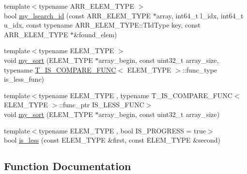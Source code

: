 \begin{DoxyCompactItemize}
\item 
{\footnotesize template$<$typename A\+R\+R\+\_\+\+E\+L\+E\+M\+\_\+\+T\+Y\+P\+E $>$ }\\bool \hyperlink{namespaceuva_1_1utils_1_1containers_1_1utils_ae11ec719b7b1058f8072e77a5a68e0be}{my\+\_\+lsearch\+\_\+id} (const A\+R\+R\+\_\+\+E\+L\+E\+M\+\_\+\+T\+Y\+P\+E $\ast$array, int64\+\_\+t l\+\_\+idx, int64\+\_\+t u\+\_\+idx, const typename A\+R\+R\+\_\+\+E\+L\+E\+M\+\_\+\+T\+Y\+P\+E\+::\+T\+Id\+Type key, const A\+R\+R\+\_\+\+E\+L\+E\+M\+\_\+\+T\+Y\+P\+E $\ast$\&found\+\_\+elem)
\item 
{\footnotesize template$<$typename E\+L\+E\+M\+\_\+\+T\+Y\+P\+E $>$ }\\void \hyperlink{namespaceuva_1_1utils_1_1containers_1_1utils_acd01e6dc6a25f1501ddd95b0e22b2239}{my\+\_\+sort} (E\+L\+E\+M\+\_\+\+T\+Y\+P\+E $\ast$array\+\_\+begin, const uint32\+\_\+t array\+\_\+size, typename \hyperlink{structuva_1_1utils_1_1containers_1_1utils_1_1_t___i_s___c_o_m_p_a_r_e___f_u_n_c}{T\+\_\+\+I\+S\+\_\+\+C\+O\+M\+P\+A\+R\+E\+\_\+\+F\+U\+N\+C}$<$ E\+L\+E\+M\+\_\+\+T\+Y\+P\+E $>$\+::func\+\_\+type is\+\_\+less\+\_\+func)
\item 
{\footnotesize template$<$typename E\+L\+E\+M\+\_\+\+T\+Y\+P\+E , typename T\+\_\+\+I\+S\+\_\+\+C\+O\+M\+P\+A\+R\+E\+\_\+\+F\+U\+N\+C$<$ E\+L\+E\+M\+\_\+\+T\+Y\+P\+E $>$\+::func\+\_\+ptr I\+S\+\_\+\+L\+E\+S\+S\+\_\+\+F\+U\+N\+C$>$ }\\void \hyperlink{namespaceuva_1_1utils_1_1containers_1_1utils_ae19599c8e6a1b8495f99fe40c69db651}{my\+\_\+sort} (E\+L\+E\+M\+\_\+\+T\+Y\+P\+E $\ast$array\+\_\+begin, const uint32\+\_\+t array\+\_\+size)
\item 
{\footnotesize template$<$typename E\+L\+E\+M\+\_\+\+T\+Y\+P\+E , bool I\+S\+\_\+\+P\+R\+O\+G\+R\+E\+S\+S = true$>$ }\\bool \hyperlink{namespaceuva_1_1utils_1_1containers_1_1utils_a3e659cca602ac3b385cc910e3c2ee416}{is\+\_\+less} (const E\+L\+E\+M\+\_\+\+T\+Y\+P\+E \&first, const E\+L\+E\+M\+\_\+\+T\+Y\+P\+E \&second)
\end{DoxyCompactItemize}


\subsection{Function Documentation}
\hypertarget{namespaceuva_1_1utils_1_1containers_1_1utils_a3e659cca602ac3b385cc910e3c2ee416}{}
